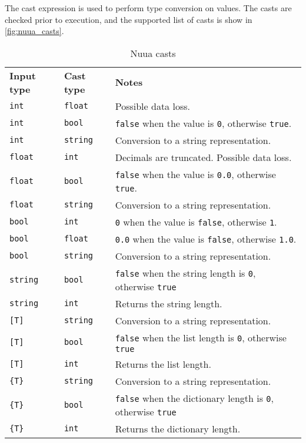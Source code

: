 The cast expression is used to perform type conversion on values. The casts are checked prior to execution, and the supported list
of casts is show in \autoref{fig:nuua_casts}.

\begin{table}[H]
    \centering
    \begin{tabular}{ l l p{9.5cm} }
        \textbf{Input type} & \textbf{Cast type} & \textbf{Notes} \\
        \texttt{int} & \texttt{float} & Possible data loss.\\
        \texttt{int} & \texttt{bool} & \texttt{false} when the value is \texttt{0}, otherwise \texttt{true}.\\
        \texttt{int} & \texttt{string} & Conversion to a string representation.\\
        \texttt{float} & \texttt{int} & Decimals are truncated. Possible data loss.\\
        \texttt{float} & \texttt{bool} & \texttt{false} when the value is \texttt{0.0}, otherwise \texttt{true}.\\
        \texttt{float} & \texttt{string} & Conversion to a string representation.\\
        \texttt{bool} & \texttt{int} & \texttt{0} when the value is \texttt{false}, otherwise \texttt{1}.\\
        \texttt{bool} & \texttt{float} & \texttt{0.0} when the value is \texttt{false}, otherwise \texttt{1.0}.\\
        \texttt{bool} & \texttt{string} & Conversion to a string representation.\\
        \texttt{string} & \texttt{bool} & \texttt{false} when the string length is \texttt{0}, otherwise \texttt{true}\\
        \texttt{string} & \texttt{int} & Returns the string length.\\
        \texttt{[T]} & \texttt{string} & Conversion to a string representation.\\
        \texttt{[T]} & \texttt{bool} & \texttt{false} when the list length is \texttt{0}, otherwise \texttt{true}\\
        \texttt{[T]} & \texttt{int} & Returns the list length.\\
        \texttt{\{T\}} & \texttt{string} & Conversion to a string representation.\\
        \texttt{\{T\}} & \texttt{bool} & \texttt{false} when the dictionary length is \texttt{0}, otherwise \texttt{true}\\
        \texttt{\{T\}} & \texttt{int} & Returns the dictionary length.\\
    \end{tabular}
    \caption{Nuua casts}
    \label{fig:nuua_casts}
\end{table}


